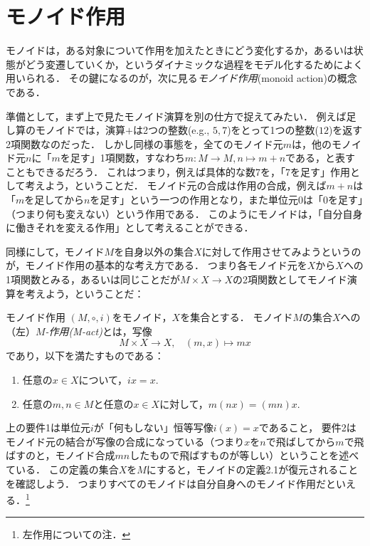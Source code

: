 \documentclass[11pt,a4paper, dvipdfmx]{jsarticle}
\begin{document}
\section{モノイド作用}
モノイドは，ある対象について作用を加えたときにどう変化するか，あるいは状態がどう変遷していくか，というダイナミックな過程をモデル化するためによく用いられる．
その鍵になるのが，次に見る\emph{モノイド作用}(monoid action)の概念である．

準備として，まず上で見たモノイド演算を別の仕方で捉えてみたい．
例えば足し算のモノイドでは，演算$+$は2つの整数(e.g., $5, 7$)をとって1つの整数($12$)を返す2項関数なのだった．
しかし同様の事態を，全てのモノイド元$m$は，他のモノイド元$n$に「$m$を足す」1項関数，すなわち$m:M \to M, n \mapsto m+n$である，と表すこともできるだろう．
これはつまり，例えば具体的な数7を，「7を足す」作用として考えよう，ということだ．
モノイド元の合成は作用の合成，例えば$m+n$は「$m$を足してから$n$を足す」という一つの作用となり，また単位元$0$は「$0$を足す」（つまり何も変えない）という作用である．
このようにモノイドは，「自分自身に働きそれを変える作用」として考えることができる．

同様にして，モノイド$M$を自身以外の集合$X$に対して作用させてみようというのが，モノイド作用の基本的な考え方である．
つまり各モノイド元を$X$から$X$への1項関数とみる，あるいは同じことだが$M \times X \to X$の2項関数としてモノイド演算を考えよう，ということだ：

\begin{dfn}{モノイド作用}{}
 $(M, \circ, i)$をモノイド，$X$を集合とする．
 モノイド$M$の集合$X$への（左）\emph{$M$-作用(M-act)}とは，写像
 \[
  M \times X \to X, \ \ \ \ (m, x) \mapsto mx
 \]
 であり，以下を満たすものである：
 \begin{enumerate}
  \item 任意の$x \in X$について，$ix = x$.
  \item 任意の$m, n \in M$と任意の$x \in X$に対して，$m(nx) = (mn)x$.
 \end{enumerate}
\end{dfn}
上の要件1は単位元$i$が「何もしない」恒等写像$i(x)=x$であること，
要件2はモノイド元の結合が写像の合成になっている（つまり$x$を$n$で飛ばしてから$m$で飛ばすのと，モノイド合成$mn$したもので飛ばすものが等しい）ということを述べている．
この定義の集合$X$を$M$にすると，モノイドの定義2.1が復元されることを確認しよう．
つまりすべてのモノイドは自分自身へのモノイド作用だといえる．\footnote{左作用についての注．}
\end{document}
